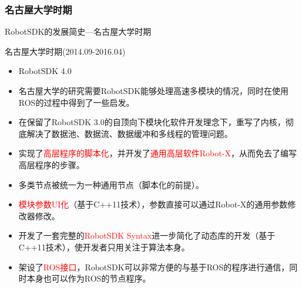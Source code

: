 \documentclass[9pt]{beamer}
\begin{document}
	\subsubsection{名古屋大学时期}
	\begin{frame}{RobotSDK的发展简史---名古屋大学时期}
		\begin{block}{名古屋大学时期(2014.09-2016.04)}
			\begin{itemize}
				\item RobotSDK 4.0
				\item 名古屋大学的研究需要RobotSDK能够处理高速多模块的情况，同时在使用ROS的过程中得到了一些启发。
				\item 在保留了RobotSDK 3.0的自顶向下模块化软件开发理念下，重写了内核，彻底解决了数据池、数据流、数据缓冲和多线程的管理问题。
				\item 实现了\textcolor{red}{高层程序的脚本化}，并开发了\textcolor{red}{通用高层软件Robot-X}，从而免去了编写高层程序的步骤。
				\item 多类节点被统一为一种通用节点（脚本化的前提）。
				\item \textcolor{red}{模块参数UI化}（基于C++11技术），参数直接可以通过Robot-X的通用参数修改器修改。
				\item 开发了一套完整的\textcolor{red}{RobotSDK Syntax}进一步简化了动态库的开发（基于C++11技术），使开发者只用关注于算法本身。
				\item 架设了\textcolor{red}{ROS接口}，RobotSDK可以非常方便的与基于ROS的程序进行通信，同时本身也可以作为ROS的节点程序。
			\end{itemize}
		\end{block}
	\end{frame}
	
\end{document}

